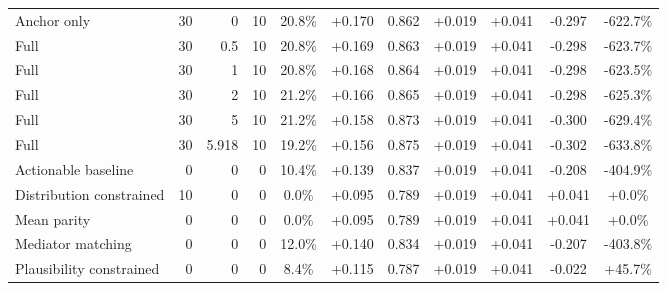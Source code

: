 \begin{table}[htbp]
\begin{tabular}{lrrrccccccc}
Anchor only & 30 & 0 & 10 & 20.8\% & +0.170 & 0.862 & +0.019 & +0.041 & -0.297 & -622.7\% \\
Full & 30 & 0.5 & 10 & 20.8\% & +0.169 & 0.863 & +0.019 & +0.041 & -0.298 & -623.7\% \\
Full & 30 & 1 & 10 & 20.8\% & +0.168 & 0.864 & +0.019 & +0.041 & -0.298 & -623.5\% \\
Full & 30 & 2 & 10 & 21.2\% & +0.166 & 0.865 & +0.019 & +0.041 & -0.298 & -625.3\% \\
Full & 30 & 5 & 10 & 21.2\% & +0.158 & 0.873 & +0.019 & +0.041 & -0.300 & -629.4\% \\
Full & 30 & 5.918 & 10 & 19.2\% & +0.156 & 0.875 & +0.019 & +0.041 & -0.302 & -633.8\% \\
Actionable baseline & 0 & 0 & 0 & 10.4\% & +0.139 & 0.837 & +0.019 & +0.041 & -0.208 & -404.9\% \\
Distribution constrained & 10 & 0 & 0 & 0.0\% & +0.095 & 0.789 & +0.019 & +0.041 & +0.041 & +0.0\% \\
Mean parity & 0 & 0 & 0 & 0.0\% & +0.095 & 0.789 & +0.019 & +0.041 & +0.041 & +0.0\% \\
Mediator matching & 0 & 0 & 0 & 12.0\% & +0.140 & 0.834 & +0.019 & +0.041 & -0.207 & -403.8\% \\
Plausibility constrained & 0 & 0 & 0 & 8.4\% & +0.115 & 0.787 & +0.019 & +0.041 & -0.022 & +45.7\% \\
\bottomrule
\end{tabular}
\end{table}